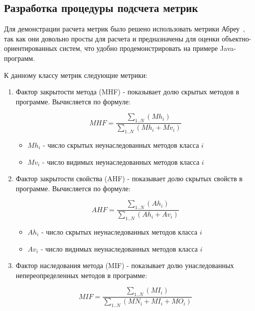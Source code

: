 \subsection{Разработка процедуры подсчета метрик}

Для демонстрации расчета метрик было решено использовать метрики
Абреу~\cite{Abreu1998}, так как они довольно просты для расчета и предназначены
для оценки объектно-ориентированных систем, что удобно продемонстрировать на
примере Java-программ.

К данному классу метрик следующие метрики:

\begin{enumerate}
    \item Фактор закрытости метода (MHF) - показывает долю скрытых методов в
    программе. Вычисляется по формуле:

    \begin{equation}
        MHF = \frac{\sum_{1..N}(Mh_i)}{\sum_{1..N}(Mh_i + Mv_i)}
    \end{equation}

    \begin{itemize}
        \item $Mh_i$ - число скрытых неунаследованных методов класса $i$
        \item $Mv_i$ - число видимых неунаследованных методов класса $i$
    \end{itemize}

    \item Фактор закрытости свойства (AHF) - показывает долю скрытых свойств в
    программе. Вычисляется по формуле:

    \begin{equation}
        AHF = \frac{\sum_{1..N}(Ah_i)}{\sum_{1..N}(Ah_i + Av_i)}
    \end{equation}

    \begin{itemize}
        \item $Ah_i$ - число скрытых неунаследованных методов класса $i$
        \item $Av_i$ - число видимых неунаследованных методов класса $i$
    \end{itemize}

    \item Фактор наследования метода (MIF) - показывает долю унаследованных
    непереопределенных методов в программе:

    \begin{equation}
        MIF = \frac{\sum_{1..N}(MI_i)}{\sum_{1..N}(MN_i + MI_i + MO_i)}
    \end{equation}


\end{enumerate}
